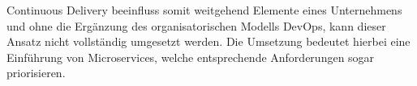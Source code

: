 Continuous Delivery beeinfluss somit weitgehend Elemente eines Unternehmens und ohne die Ergänzung des organisatorischen Modells DevOps, kann dieser Ansatz nicht vollständig umgesetzt werden. Die Umsetzung bedeutet hierbei eine Einführung von Microservices, welche entsprechende Anforderungen sogar priorisieren.


\ifCLASSOPTIONcaptionsoff
  \newpage
\fi